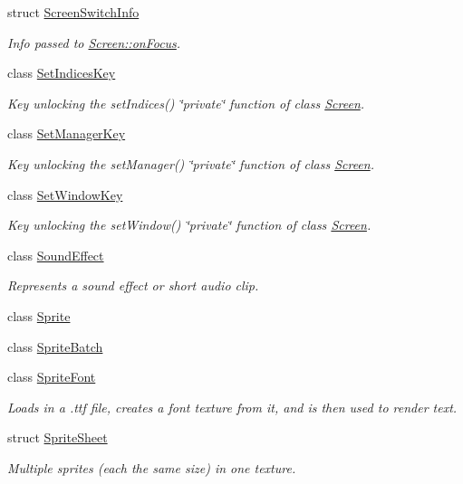 \begin{DoxyCompactItemize}
struct \hyperlink{structnta_1_1ScreenSwitchInfo}{Screen\+Switch\+Info}
\begin{DoxyCompactList}\small\item\em Info passed to \hyperlink{classnta_1_1Screen_a895548cdf2a5170d671983fc9189579a}{Screen\+::on\+Focus}. \end{DoxyCompactList}\item 
class \hyperlink{classnta_1_1SetIndicesKey}{Set\+Indices\+Key}
\begin{DoxyCompactList}\small\item\em Key unlocking the set\+Indices() \char`\"{}private\char`\"{} function of class \hyperlink{classnta_1_1Screen}{Screen}. \end{DoxyCompactList}\item 
class \hyperlink{classnta_1_1SetManagerKey}{Set\+Manager\+Key}
\begin{DoxyCompactList}\small\item\em Key unlocking the set\+Manager() \char`\"{}private\char`\"{} function of class \hyperlink{classnta_1_1Screen}{Screen}. \end{DoxyCompactList}\item 
class \hyperlink{classnta_1_1SetWindowKey}{Set\+Window\+Key}
\begin{DoxyCompactList}\small\item\em Key unlocking the set\+Window() \char`\"{}private\char`\"{} function of class \hyperlink{classnta_1_1Screen}{Screen}. \end{DoxyCompactList}\item 
class \hyperlink{classnta_1_1SoundEffect}{Sound\+Effect}
\begin{DoxyCompactList}\small\item\em Represents a sound effect or short audio clip. \end{DoxyCompactList}\item 
class \hyperlink{classnta_1_1Sprite}{Sprite}
\item 
class \hyperlink{classnta_1_1SpriteBatch}{Sprite\+Batch}
\item 
class \hyperlink{classnta_1_1SpriteFont}{Sprite\+Font}
\begin{DoxyCompactList}\small\item\em Loads in a .ttf file, creates a font texture from it, and is then used to render text. \end{DoxyCompactList}\item 
struct \hyperlink{structnta_1_1SpriteSheet}{Sprite\+Sheet}
\begin{DoxyCompactList}\small\item\em Multiple sprites (each the same size) in one texture. \end{DoxyCompactList}\item 

\end{DoxyCompactItemize}
